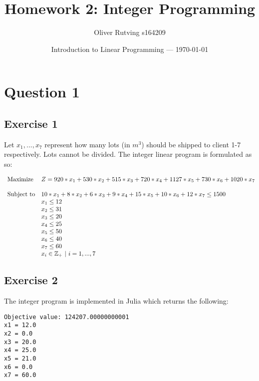 \documentclass{article}
\title{Homework 2: Integer Programming} %
\author{Oliver Rutving s164209} %
\date{Introduction to Linear Programming  --- \today} %
\begin{document}
\maketitle %


\section{Question 1}
\subsection{Exercise 1}
Let $x_1, ..., x_7$ represent how many lots (in $m^3$) should be shipped to client 1-7 respectively. 
Lots cannot be divided. The integer linear program is formulated as so:

\begin{equation*}
  \begin{array}{ll@{}ll}
  \text{Maximize}  & Z=920*x_1+530*x_2+515*x_3+720*x_4+1127*x_5+730*x_6+1020*x_7\\
                   & \\
  \text{Subject to}& 10*x_1+8*x_2+6*x_3+9*x_4+15*x_5+10*x_6+12*x_7 \leq 1500\\
                   & x_1\leq 12 \\
                   & x_2\leq 31 \\
                   & x_3\leq 20 \\
                   & x_4\leq 25 \\
                   & x_5\leq 50 \\
                   & x_6\leq 40 \\
                   & x_7\leq 60 \\
                   & x_i\in \mathbb{Z_+}\ |\ i=1,...,7
  \end{array}
\end{equation*}


\subsection{Exercise 2}
The integer program is implemented in Julia which returns the following:

\begin{commandline}
\begin{verbatim}
Objective value: 124207.00000000001
x1 = 12.0
x2 = 0.0
x3 = 20.0
x4 = 25.0
x5 = 21.0
x6 = 0.0
x7 = 60.0
	\end{verbatim}
\end{commandline}
\end{document}
